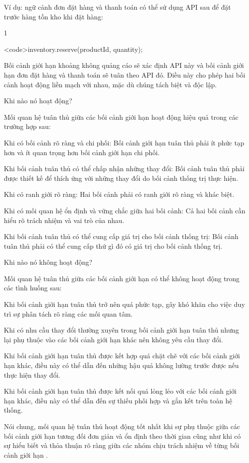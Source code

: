 Ví dụ: ngữ cảnh đơn đặt hàng và thanh toán có thể sử dụng API sau để đặt trước hàng tồn kho khi đặt hàng:

1

<code>inventory.reserve(productId, quantity);

Bối cảnh giới hạn khoảng không quảng cáo sẽ xác định API này và bối cảnh giới hạn đơn đặt hàng và thanh toán sẽ tuân theo API đó. Điều này cho phép hai bối cảnh hoạt động liền mạch với nhau, mặc dù chúng tách biệt và độc lập.

Khi nào nó hoạt động?

Mối quan hệ tuân thủ giữa các bối cảnh giới hạn hoạt động hiệu quả trong các trường hợp sau:

Khi có bối cảnh rõ ràng và chi phối: Bối cảnh giới hạn tuân thủ phải ít phức tạp hơn và ít quan trọng hơn bối cảnh giới hạn chi phối.

Khi bối cảnh tuân thủ có thể chấp nhận những thay đổi: Bối cảnh tuân thủ phải được thiết kế để thích ứng với những thay đổi do bối cảnh thống trị thực hiện.

Khi có ranh giới rõ ràng: Hai bối cảnh phải có ranh giới rõ ràng và khác biệt.

Khi có mối quan hệ ổn định và vững chắc giữa hai bối cảnh: Cả hai bối cảnh cần hiểu rõ trách nhiệm và vai trò của nhau.

Khi bối cảnh tuân thủ có thể cung cấp giá trị cho bối cảnh thống trị: Bối cảnh tuân thủ phải có thể cung cấp thứ gì đó có giá trị cho bối cảnh thống trị.

Khi nào nó không hoạt động?

Mối quan hệ tuân thủ giữa các bối cảnh giới hạn có thể không hoạt động trong các tình huống sau:

Khi bối cảnh giới hạn tuân thủ trở nên quá phức tạp, gây khó khăn cho việc duy trì sự phân tách rõ ràng các mối quan tâm.

Khi có nhu cầu thay đổi thường xuyên trong bối cảnh giới hạn tuân thủ nhưng lại phụ thuộc vào các bối cảnh giới hạn khác nên không yêu cầu thay đổi.

Khi bối cảnh giới hạn tuân thủ được kết hợp quá chặt chẽ với các bối cảnh giới hạn khác, điều này có thể dẫn đến những hậu quả không lường trước được nếu thực hiện thay đổi.

Khi bối cảnh giới hạn tuân thủ được kết nối quá lỏng lẻo với các bối cảnh giới hạn khác, điều này có thể dẫn đến sự thiếu phối hợp và gắn kết trên toàn hệ thống.

Nói chung, mối quan hệ tuân thủ hoạt động tốt nhất khi sự phụ thuộc giữa các bối cảnh giới hạn tương đối đơn giản và ổn định theo thời gian cũng như khi có sự hiểu biết và thỏa thuận rõ ràng giữa các nhóm chịu trách nhiệm về từng bối cảnh giới hạn .





